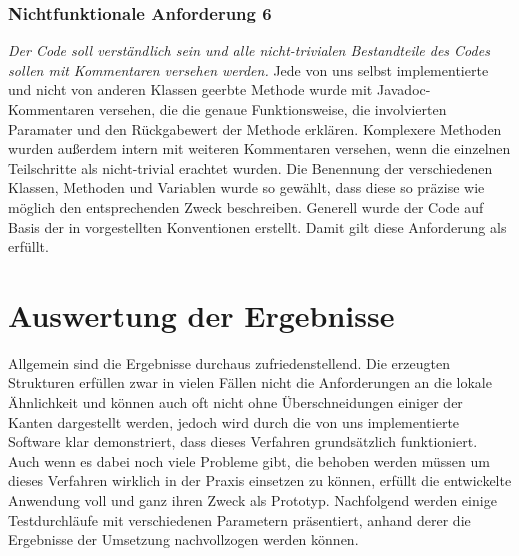 \subsubsection{Nichtfunktionale Anforderung 6}
\textit{Der Code soll verständlich sein und alle nicht-trivialen Bestandteile des Codes sollen mit Kommentaren versehen werden.} Jede von uns selbst
implementierte und nicht von anderen Klassen geerbte Methode wurde mit Javadoc-Kommentaren versehen, die die genaue Funktionsweise, die involvierten
Paramater und den Rückgabewert der Methode erklären. Komplexere Methoden wurden außerdem intern mit weiteren Kommentaren versehen, wenn die einzelnen
Teilschritte als nicht-trivial erachtet wurden. Die Benennung der verschiedenen Klassen, Methoden und Variablen wurde so gewählt, dass diese so präzise
wie möglich den entsprechenden Zweck beschreiben. Generell wurde der Code auf Basis der in \cite{49_java_conventions} vorgestellten Konventionen erstellt.
Damit gilt diese Anforderung als erfüllt.

\section{Auswertung der Ergebnisse}
Allgemein sind die Ergebnisse durchaus zufriedenstellend. Die erzeugten Strukturen erfüllen zwar in vielen Fällen nicht die Anforderungen an die lokale
Ähnlichkeit und können auch oft nicht ohne Überschneidungen einiger der Kanten dargestellt werden, jedoch wird durch die von uns implementierte Software
klar demonstriert, dass dieses Verfahren grundsätzlich funktioniert. Auch wenn es dabei noch viele Probleme gibt, die behoben werden müssen um dieses
Verfahren wirklich in der Praxis einsetzen zu können, erfüllt die entwickelte Anwendung voll und ganz ihren Zweck als Prototyp. Nachfolgend werden einige
Testdurchläufe mit verschiedenen Parametern präsentiert, anhand derer die Ergebnisse der Umsetzung nachvollzogen werden können.

